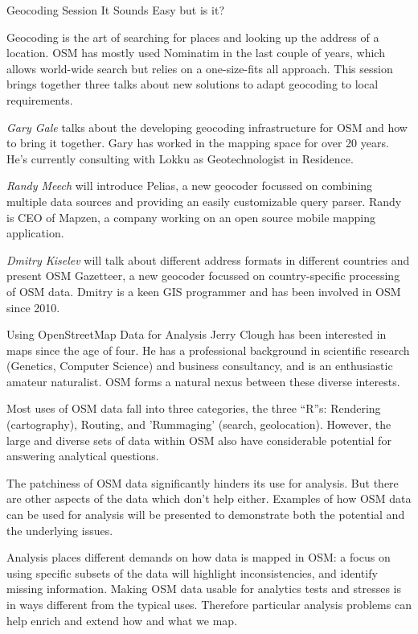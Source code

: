 %
{Geocoding Session}%
{It Sounds Easy but is it?}%
{}%
{Geocoding is the art of searching for places and looking up
the address of a location.
OSM has mostly used Nominatim in the last couple of years, which
allows world-wide search but relies on a one-size-fits all approach.
This session brings together three talks about new solutions to
adapt geocoding to local requirements.

\textit{Gary Gale} talks about the developing geocoding infrastructure for
OSM and how to bring it together. Gary has worked in the mapping
space for over 20 years. He's currently consulting with Lokku as
Geotechnologist in Residence.

\textit{Randy Meech} will introduce Pelias, a new geocoder focussed
on combining multiple data sources and providing an easily customizable
query parser. Randy is CEO of Mapzen, a company working on an open source
mobile mapping application.

\textit{Dmitry Kiselev} will talk about different address formats in different
countries and present OSM Gazetteer, a new geocoder focussed on
country-specific processing of OSM data. Dmitry is a keen GIS programmer
and has been involved in OSM since 2010.
}

%
{Using OpenStreetMap Data for Analysis}%
{Jerry Clough has been interested in maps since the age of four. He has a professional background in scientific research (Genetics, Computer Science) and business consultancy, and is an enthusiastic amateur naturalist. OSM forms a natural nexus between these diverse interests. }%
{Most uses of OSM data fall into three categories, the three ``R''s: Rendering (cartography), Routing, and 'Rummaging' (search, geolocation). However, the large and diverse sets of data within OSM also have considerable potential for answering analytical questions.

The patchiness of OSM data significantly hinders its use for analysis.  But there are other aspects of the data which don't help either. Examples of how OSM data can be used for analysis will be presented to demonstrate both the potential and the underlying issues.

Analysis places different demands on how data is map\-ped in OSM: a focus on using specific subsets of the data will highlight inconsistencies, and identify missing information. Making OSM data usable for analytics tests and stresses is in ways different from the typical uses. Therefore particular analysis problems can help enrich and extend how and what we map.}
